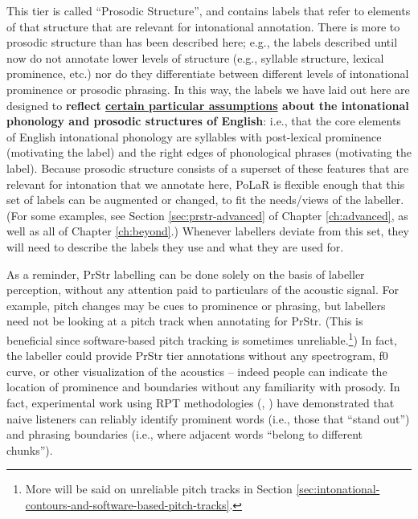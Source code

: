 \documentclass[11pt, twoside]{memoir}
\def\textlabel#1{{\relsize{-.5}\fontspec[Mapping=tex-text]{Roboto Mono}{#1}}}
\begin{document}
\begin{infobox}[frametitle=\textbf{A side-note about this tier}]
This tier is called “Prosodic Structure”, and contains labels that refer to elements of that structure that are relevant for intonational annotation. There is more to prosodic structure than has been described here; e.g., the labels described until now do not annotate lower levels of structure (e.g., syllable structure, lexical prominence, etc.) nor do they differentiate between different levels of intonational prominence or prosodic phrasing. In this way, the labels we have laid out here are designed to \textbf{reflect \uline{certain particular assumptions} about the intonational phonology and prosodic structures of English}: i.e., that the core elements of English intonational phonology are syllables with post-lexical prominence (motivating the \textlabel{*} label) and the right edges of phonological phrases (motivating the \textlabel{]} label). Because prosodic structure consists of a superset of these features that are relevant for intonation that we annotate here, PoLaR is flexible enough that this set of labels can be augmented or changed, to fit the needs\slash views of the labeller. (For some examples, see Section \ref{sec:prstr-advanced} of Chapter \ref{ch:advanced}, as well as all of Chapter \ref{ch:beyond}.) Whenever labellers deviate from this set, they will need to describe the labels they use and what they are used for.
\end{infobox}

As a reminder, PrStr labelling can be done solely on the basis of labeller perception, without any attention paid to particulars of the acoustic signal. For example, pitch changes may be cues to prominence or phrasing, but labellers need not be looking at a pitch track when annotating for PrStr. (This is beneficial since software-based pitch tracking is sometimes unreliable.\footnote{More will be said on unreliable pitch tracks in Section \ref{sec:intonational-contours-and-software-based-pitch-tracks}.}) In fact, the labeller could provide PrStr tier annotations without any spectrogram, f0 curve, or other visualization of the acoustics – indeed people can indicate the location of prominence and boundaries without any familiarity with prosody. In fact, experimental work using RPT methodologies (\citealt{cole-14, cole-17}, \citealt{cole-16}) have demonstrated that naive listeners can reliably identify prominent words (i.e., those that “stand out”) and phrasing boundaries (i.e., where adjacent words “belong to different chunks”).
\end{document}
